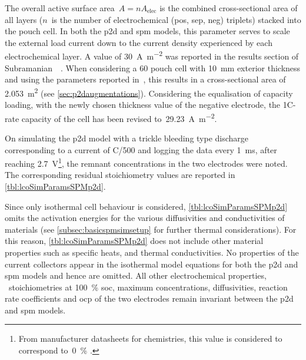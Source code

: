 The  overall  active  surface  area~${A  = n  A_\text{elec}}$  is  the  combined
cross-sectional area of  all layers ($n$~is the number  of electrochemical (pos,
sep,  neg)  triplets)  stacked  into  the pouch  cell.  In  both  the  \gls{p2d}
and  \gls{spm}  models,  this  parameter  serves  to  scale  the  external  load
current  down  to  the  current  density  experienced  by  each  electrochemical
layer.  A   value  of  \approx\SI{30}{\ampere\per\meter\squared}   was  reported
in  the  results  section  of  Subramanian~\etal{}~\cite{Subramanian2009}.  When
considering a  \SI{60}{\amphour} pouch cell with  \SI{10}{\milli\meter} exterior
thickness   and  using   the   parameters  reported   in~\cite{Subramanian2009},
this  results  in  a  cross-sectional area  of  \SI{2.053}{\meter\squared}  (see
\cref{sec:p2daugmentations}). Considering the  equalisation of capacity loading,
with the  newly chosen thickness  value of  the negative electrode,  the 1C-rate
capacity of the cell has been revised to~\SI{29.23}{\ampere\per\meter\squared}.

On  simulating  the \gls{p2d}  model  with  a  trickle bleeding  type  discharge
corresponding   to   a  current   of   C/500   and   logging  the   data   every
\SI{1}{\milli\second}, after reaching \SI{2.7}{\volt}\footnote{From manufacturer
datasheets  for   chemistries,  this value  is considered  to
correspond to~\SI{0}{\percent} .}, the remnant concentrations
in  the two  electrodes  were noted.  The  corresponding residual  stoichiometry
values are reported in \cref{tbl:lcoSimParamsSPMp2d}.


Since      only      isothermal      cell     behaviour      is      considered,
\cref{tbl:lcoSimParamsSPMp2d}    omits     the    activation     energies    for
the    various   diffusivities    and   conductivities    of   materials    (see
\cref{subsec:basicspmsimsetup}  for further  thermal  considerations). For  this
reason, \cref{tbl:lcoSimParamsSPMp2d} does not include other material properties
such as specific heats, and thermal conductivities. No properties of the current
collectors appear in  the isothermal model equations for both  the \gls{p2d} and
\gls{spm} models  and hence are  omitted. All other  electrochemical properties,
\viz~stoichiometries  at \SI{100}{\percent}  \gls{soc}, maximum  concentrations,
diffusivities, reaction  rate coefficients and  \gls{ocp} of the  two electrodes
remain invariant between the \gls{p2d} and \gls{spm} models.

